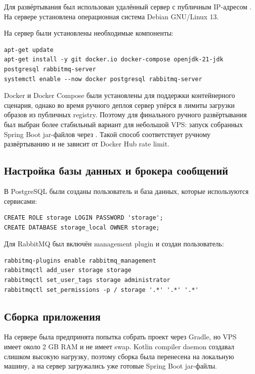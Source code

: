 \documentclass[14pt,a4paper]{extarticle}
\newcommand{\code}[1]{\texttt{\detokenize{#1}}}
\begin{document}
Для развёртывания был использован удалённый сервер с публичным IP-адресом \code{186.246.13.204}. На сервере установлена операционная система Debian GNU/Linux 13.

На сервер были установлены необходимые компоненты:

\begin{lstlisting}[style=codestyle]
apt-get update
apt-get install -y git docker.io docker-compose openjdk-21-jdk postgresql rabbitmq-server
systemctl enable --now docker postgresql rabbitmq-server
\end{lstlisting}

Docker и Docker Compose были установлены для поддержки контейнерного сценария, однако во время ручного деплоя сервер упёрся в лимиты загрузки образов из публичных registry. Поэтому для финального ручного развёртывания был выбран более стабильный вариант для небольшой VPS: запуск собранных Spring Boot jar-файлов через \code{systemd}. Такой способ соответствует ручному развёртыванию и не зависит от Docker Hub rate limit.

\subsection{Настройка базы данных и брокера сообщений}

В PostgreSQL были созданы пользователь и база данных, которые используются сервисами:

\begin{lstlisting}[style=codestyle]
CREATE ROLE storage LOGIN PASSWORD 'storage';
CREATE DATABASE storage_local OWNER storage;
\end{lstlisting}

Для RabbitMQ был включён management plugin и создан пользователь:

\begin{lstlisting}[style=codestyle]
rabbitmq-plugins enable rabbitmq_management
rabbitmqctl add_user storage storage
rabbitmqctl set_user_tags storage administrator
rabbitmqctl set_permissions -p / storage '.*' '.*' '.*'
\end{lstlisting}

\subsection{Сборка приложения}

На сервере была предпринята попытка собрать проект через Gradle, но VPS имеет около 2 GB RAM и не имеет swap. Kotlin compiler daemon создавал слишком высокую нагрузку, поэтому сборка была перенесена на локальную машину, а на сервер загружались уже готовые Spring Boot jar-файлы.
\end{document}
